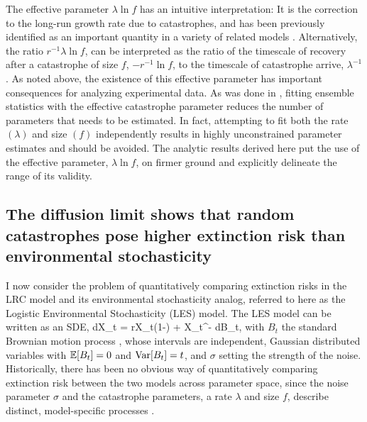 The effective parameter $\lambda\ln f$ has an intuitive interpretation:  It is the correction to the long-run growth rate due to catastrophes, and has been previously identified as an important quantity in a variety of related models \cite{bao2011competitive,hansonBook,lande1993risks}.  Alternatively, the ratio $r^{-1}\lambda\ln f$, can be interpreted as the ratio of the timescale of recovery after a catastrophe of size $f$, $-r^{-1}\ln f$, to the timescale of catastrophe arrive, $\lambda^{-1}$. As noted above, the existence of this effective parameter has important consequences for analyzing experimental data.  As was done in \cite{wilesPLOS2016}, fitting ensemble statistics with the effective catastrophe parameter reduces the number of parameters that needs to be estimated.  In fact, attempting to fit both the rate $(\lambda)$ and size $(f)$ independently results in highly unconstrained parameter estimates  \cite{wilesPLOS2016} and should be avoided.  The analytic results derived here put the use of the effective parameter, $\lambda\ln f$, on firmer ground and explicitly delineate the range of its validity.  


\subsection{The diffusion limit shows that random catastrophes pose higher extinction risk than environmental stochasticity}

I now consider the problem of quantitatively comparing extinction risks in the LRC model and its environmental stochasticity analog, referred to here as the Logistic Environmental Stochasticity (LES) model.  The LES model can be written as an SDE,
\be
dX_t = rX_t\left(1-\right) + \sigma X_{t^-} dB_t,
\ee
\noindent with $B_t$ the standard Brownian motion process \cite{hansonBook,karlin1981second}, whose intervals are independent, Gaussian distributed variables with $\mathbb{E}[B_t] = 0$ and $\text{Var}[B_t] = t$,  and $\sigma$ setting the strength of the noise.  Historically, there has been no obvious way of quantitatively comparing extinction risk between the two models across parameter space, since the noise parameter $\sigma$ and the catastrophe parameters, a rate $\lambda$ and size $f$, describe distinct, model-specific processes \cite{lande1993risks, landeBook, shaffer1987minimum}.  

